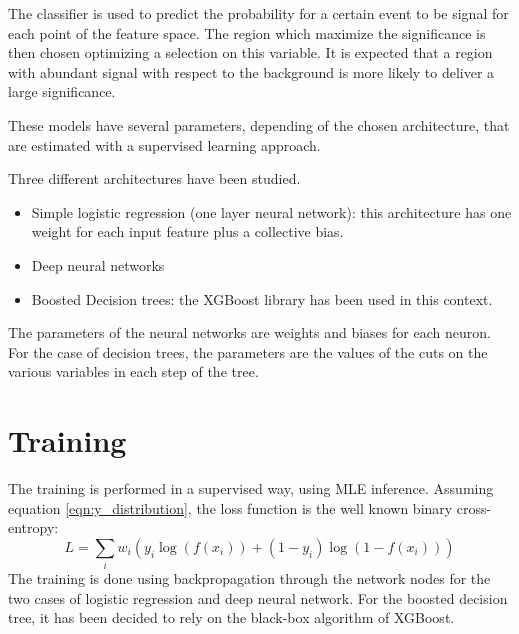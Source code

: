 \documentclass{article}
\begin{document}
The classifier is used to predict the probability for a certain event to be signal for each point of the feature space. The region which maximize the significance is then chosen optimizing a selection on this variable. It is expected that a region with abundant signal with respect to the background is more likely to deliver a large significance.

These models have several parameters, depending of the chosen architecture, that are estimated with a supervised learning approach. 

Three different architectures have been studied.
\begin{itemize}
    \item Simple logistic regression (one layer neural network): this architecture has one weight for each input feature plus a collective bias.
    \item Deep neural networks
    \item Boosted Decision trees: the XGBoost library \cite{xgboost} has been used in this context.
\end{itemize}

The parameters of the neural networks are weights and biases for each neuron. For the case of decision trees, the parameters are the values of the cuts on the various variables in each step of the tree.

\section{Training}
The training is performed in a supervised way, using MLE inference. Assuming equation \ref{eqn:y_distribution}, the loss function is the well known binary cross-entropy:
\[ L = \sum_i w_i \left( y_i \log(f(x_i)) + (1 - y_i) \log(1 - f(x_i)) \right) \]
The training is done using backpropagation through the network nodes for the two cases of logistic regression and deep neural network. For the boosted decision tree, it has been decided to rely on the black-box algorithm of XGBoost.
\end{document}
